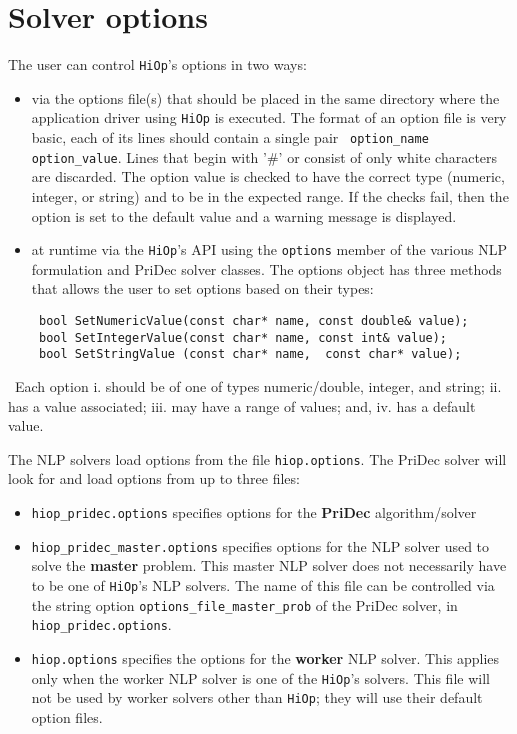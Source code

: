 \documentclass[11pt]{article}
\newcounter{line}
\newcommand{\warningSymbol}{\raisebox{0.9\depth}{\danger}}
\newcommand{\warningcp}[1]{%
        \smallskip \noindent \textcolor{warningColorText}{\warningSymbol{}}\,\textbf{#1} %
    }
\newcommand{\Hi}{\texttt{HiOp}\xspace}
\begin{document}

\section{Solver options}
The user can control \Hi's options in two ways:
\begin{itemize}
\item via the options file(s) that should be placed in the same directory where the application driver using \Hi is executed. The format of an option file is very basic, each of its lines should contain a single pair \texttt{ option\_name option\_value}. Lines that begin with '\#' or consist of only white characters are discarded. The option value is checked to have the correct type (numeric, integer, or string) and to be in the expected range. If the checks fail, then the option is set to the default value and a warning message is displayed.
\item at runtime via the \Hi's API using the \texttt{options} member of the various NLP formulation and PriDec solver classes. The options object has three methods that allows the user to set options based on their types:
\begin{lstlisting}
 bool SetNumericValue(const char* name, const double& value);
 bool SetIntegerValue(const char* name, const int& value);
 bool SetStringValue (const char* name,  const char* value);
\end{lstlisting}
\end{itemize}

\warningcp{} Each option i. should be of one of types numeric/double, integer, and string; ii. has a value associated; iii. may have a range of values;  and, iv. has a default value. 

The NLP solvers load options from the file \texttt{hiop.options}. The PriDec solver will look for and load options from up to three files:
\begin{itemize}
\item \texttt{hiop\_pridec.options} specifies options for the \textbf{PriDec} algorithm/solver
\item \texttt{hiop\_pridec\_master.options} specifies options for the NLP solver used to solve the \textbf{master} problem. This master NLP solver does not necessarily have to be one of \Hi's NLP solvers. The name of this file can be controlled via the string option \texttt{options\_file\_master\_prob} of the PriDec solver, in \texttt{hiop\_pridec.options}.
\item \texttt{hiop.options} specifies the options for the \textbf{worker} NLP solver. This applies only when the worker NLP solver is one of the \Hi's solvers. This file will not be used by worker solvers other than \Hi; they will use their default option files.
\end{itemize}
\end{document}
